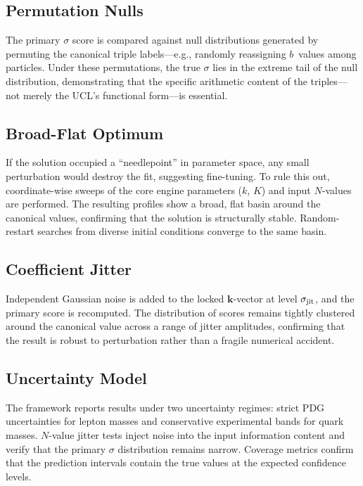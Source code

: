 \documentclass[11pt]{article}
\theoremstyle{remark}
\begin{document}
\subsection{Permutation Nulls}

The primary $\sigma$ score is compared against null distributions generated by permuting the canonical triple labels---e.g., randomly reassigning $b$~values among particles.
Under these permutations, the true $\sigma$ lies in the extreme tail of the null distribution, demonstrating that the specific arithmetic content of the triples---not merely the UCL's functional form---is essential.

\subsection{Broad-Flat Optimum}

If the solution occupied a ``needlepoint'' in parameter space, any small perturbation would destroy the fit, suggesting fine-tuning.
To rule this out, coordinate-wise sweeps of the core engine parameters ($k$, $K$) and input $N$-values are performed.
The resulting profiles show a broad, flat basin around the canonical values, confirming that the solution is structurally stable.
Random-restart searches from diverse initial conditions converge to the same basin.

\subsection{Coefficient Jitter}

Independent Gaussian noise is added to the locked $\mathbf{k}$-vector at level $\sigma_{\rm jit}$, and the primary score is recomputed.
The distribution of scores remains tightly clustered around the canonical value across a range of jitter amplitudes, confirming that the result is robust to perturbation rather than a fragile numerical accident.

\subsection{Uncertainty Model}

The framework reports results under two uncertainty regimes: strict PDG uncertainties for lepton masses and conservative experimental bands for quark masses.
$N$-value jitter tests inject noise into the input information content and verify that the primary $\sigma$ distribution remains narrow.
Coverage metrics confirm that the prediction intervals contain the true values at the expected confidence levels.
\end{document}

